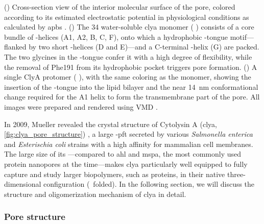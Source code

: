 \begin{figure*}[p]
{  %
  ()
  Cross-section view of the interior molecular surface of the pore, colored according to its estimated
  electrostatic potential in physiological conditions as calculated by \gls{apbs}
  \cite{Baker-2001,Baker-2005}.
  ()
  The \SI{34}{\kDa} water-soluble \gls{clya} monomer ( \cite{Wallace-2000}) consists of a core
  bundle of \ta-helices (\ta A1, \ta A2, \ta B, \ta C, \ta F), onto which a hydrophobic \tb-tongue
  motif---flanked by two short \ta-helices (\ta D and \ta E)---and a C-terminal \ta-helix (\ta G) are packed.
  The two glycines in the \tb-tongue confer it with a high degree of flexibility, while the removal of Phe191
  from its hydrophobic pocket triggers pore formation.
  ()
  A single ClyA protomer ( \cite{Peng-2019}), with the same coloring as the monomer, showing the
  insertion of the \ta-tongue into the lipid bilayer and the near \SI{14}{\nm} conformational change required
  for the \ta A1 helix to form the transmembrane part of the pore.
  All images were prepared and rendered using VMD \cite{Humphrey-1996,Stone-1998}.
  }\label{fig:clya_pore_structure}
\end{figure*}

In 2009, Mueller \etal{} revealed the crystal structure of Cytolysin A (\gls{clya},
\cref{fig:clya_pore_structure}) \cite{Mueller-2009}, a large \textalpha-\gls{pft} secreted by various
\textit{Salmonella enterica} and \textit{Esterischia coli} strains with a high affinity for mammalian cell
membranes. The large size of its \lumen---compared to \gls{ahl} and \gls{mspa}, the most commonly used protein
nanopores at the time---makes \gls{clya} particularly well equipped to fully capture and study larger
biopolymers, such as proteins, in their native three-dimensional configuration (\ie~folded). In the following
section, we will discuss the structure and oligomerization mechanism of \gls{clya} in detail.

\subsubsection{Pore structure}

